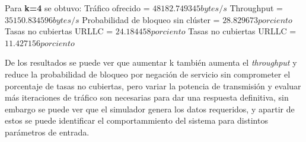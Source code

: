 Para \textbf{k=4} se obtuvo:\newline
Tráfico ofrecido = $48182.749345 bytes/s$ \newline
Throughput = $35150.834596 bytes/s$ \newline
Probabilidad de bloqueo sin clúster = $28.829673 porciento$ \newline
Tasas no cubiertas URLLC = $24.184458 porciento$ \newline
Tasas no cubiertas URLLC = $11.427156 porciento$ \newline

De los resultados se puede ver que aumentar k también aumenta el \textit{throughput} y reduce la probabilidad de bloqueo por negación de servicio sin comprometer el porcentaje de tasas no cubiertas, pero variar la potencia de transmisión y evaluar más iteraciones de tráfico son necesarias para dar una respuesta definitiva, sin embargo se puede ver que el simulador genera los datos requeridos, y apartir de estos se puede identificar el comportammiento del sistema para distintos parámetros de entrada.